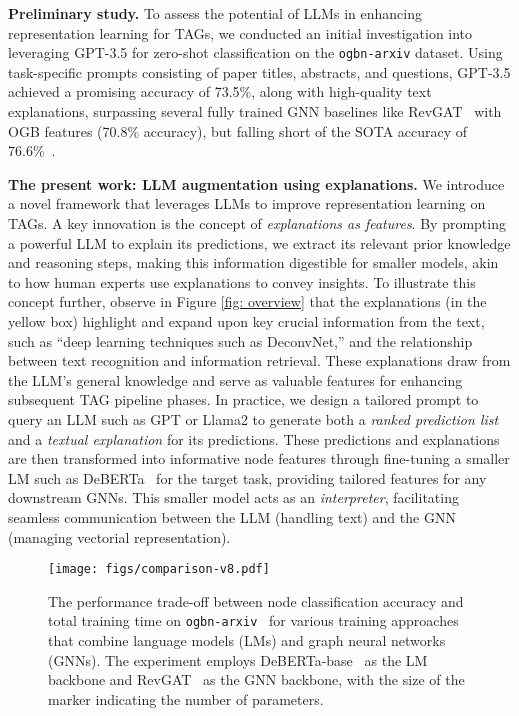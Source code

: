 \documentclass{article}
\begin{document}
\textbf{Preliminary study.} To assess the potential of LLMs in enhancing representation learning for TAGs, we conducted an initial investigation into leveraging GPT-3.5 for zero-shot classification on the \texttt{ogbn-arxiv} dataset. Using task-specific prompts consisting of paper titles, abstracts, and questions, GPT-3.5 achieved a promising accuracy of 73.5\%, along with high-quality text explanations, surpassing several fully trained GNN baselines like RevGAT~\citep{li2021training_revgat} with OGB features (70.8\% accuracy), but falling short of the SOTA accuracy of 76.6\%~\citep{zhao2022learning_em}.


\textbf{The present work: LLM augmentation using explanations.} We introduce a novel framework that leverages LLMs to improve representation learning on TAGs. A key innovation is the concept of \emph{explanations as features}. By prompting a powerful LLM to explain its predictions, we extract its relevant prior knowledge and reasoning steps, making this information digestible for smaller models, akin to how human experts use explanations to convey insights. To illustrate this concept further, observe in Figure \ref{fig: overview} that the explanations (in the yellow box) highlight and expand upon key crucial information from the text, such as ``deep learning techniques such as DeconvNet,'' and the relationship between text recognition and information retrieval. These explanations draw from the LLM's general knowledge and serve as valuable features for enhancing subsequent TAG pipeline phases. In practice, we design a tailored prompt to query an LLM such as GPT or Llama2 to generate both a \emph{ranked prediction list} and a \emph{textual explanation} for its predictions. These predictions and explanations are then transformed into informative node features through fine-tuning a smaller LM such as DeBERTa~\citep{he2021deberta} for the target task, providing tailored features for any downstream GNNs. This smaller model acts as an {\it interpreter}, facilitating seamless communication between the LLM (handling text) and the GNN (managing vectorial representation). 



\begin{figure}[t]
\vspace{-0.5cm}
    \centering
    \texttt{[image: figs/comparison-v8.pdf]}
    \caption{The performance trade-off between node classification accuracy and total training time on \texttt{ogbn-arxiv}~\citep{hu2020open} for various training approaches that combine language models (LMs) and graph neural networks (GNNs). The experiment employs DeBERTa-base~\citep{he2021deberta} as the LM backbone and RevGAT~\citep{li2021training_revgat} as the GNN backbone,  with the size of the marker indicating the number of parameters.}
    \label{fig: comparison}
    \vspace{-0.25cm}
\end{figure}
\end{document}
